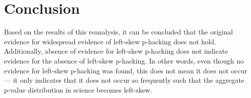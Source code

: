 \section*{Conclusion}
Based on the results of this reanalysis, it can be concluded that the original evidence for widespread evidence of left-skew p-hacking \cite{Head_2015} does not hold. Additionally, absence of evidence for left-skew p-hacking does not indicate evidence for the absence of left-skew p-hacking. In other words, even though no evidence for left-skew p-hacking was found, this does not mean it does not occur --- it only indicates that it does not occur so frequently such that the aggregate p-value distribution in science becomes left-skew. 
  
  
  